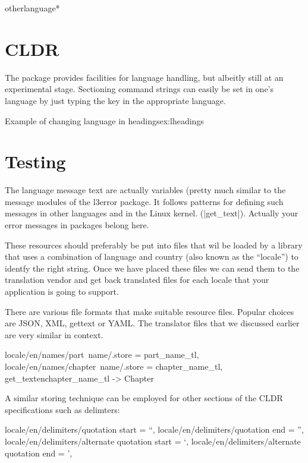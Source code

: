 \begin{docCommandd}{otherlanguage*} { }
\chapter{CLDR}

The  package provides facilities for language handling, but albeitly still at an experimental stage. Sectioning command strings can easily be set in one's language by just typing the key in the appropriate language.

\begin{texexample}{Example of changing language in headings}{ex:lheadings}
\bgroup
{}
\chapter{Testing}
        
\egroup
\end{texexample}


The language message text are actually variables (pretty much similar to the message modules of the l3error package. It follows
patterns for defining such messages in other languages and in the Linux kernel. (|get_text|). Actually your error messages
in packages belong here. 

These resources should preferably be put into files that wil be loaded by a library that uses a combination of language and country (also known as the \enquote{locale}) to identfy the right string. Once we have placed these files we can send them to the translation vendor and get back translated files for each locale that your application is going to support.

There are various file formats that make suitable resource files. Popular choices are JSON, XML, gettext or YAML. The translator files that we discussed earlier are very similar in context. 

\begin{phdverbatim}     
     locale/en/names/part~name/.store      = part_name_tl,
     locale/en/names/chapter~name/.store   = chapter_name_tl,
     get_text{en}{chapter_name_tl} -> Chapter
\end{phdverbatim} 

A similar storing technique can be employed for other sections of the CLDR specifications such as delimters:

\begin{phdverbatim}
    locale/en/delimiters/quotation start = “,
    locale/en/delimiters/quotation end =  ”,
    locale/en/delimiters/alternate quotation start = ‘,
    locale/en/delimiters/alternate quotation end = ’,
\end{phdverbatim}


\end{docCommandd}
